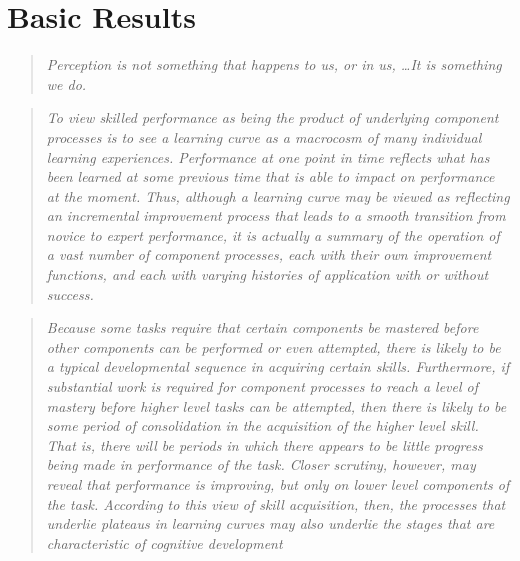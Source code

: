 \documentclass[../main.tex]{subfiles}
\begin{document}
\chapter{Basic Results}\label{chap:basic_results}


\begin{quote}
    \emph{Perception is not something that happens to us, or in us, \lbrack\ldots\rbrack It is something we do.}\\ 
\end{quote}

\begin{quote}
    \emph{To view skilled performance as being the product of underlying component processes is to see a learning curve as a macrocosm of many individual learning experiences. Performance at one point in time reflects what has been learned at some previous time that is able to impact on performance at the moment. Thus, although a learning curve may be viewed as reflecting an incremental improvement process that leads to a smooth transition from novice to expert performance, it is actually a summary of the operation of a vast number of component processes, each with their own improvement functions, and each with varying histories of application with or without success.}\\
\end{quote}

\begin{quote}
    \emph{Because some tasks require that certain components be mastered before other components can be performed or even attempted, there is likely to be a typical developmental sequence in acquiring certain skills. Furthermore, if substantial work is required for component processes to reach a level of mastery before higher level tasks can be attempted, then there is likely to be some period of consolidation in the acquisition of the higher level skill. That is, there will be periods in which there appears to be little progress being made in performance of the task. Closer scrutiny, however, may reveal that performance is improving, but only on lower level components of the task. According to this view of skill acquisition, then, the processes that underlie plateaus in learning curves may also underlie the stages that are characteristic of cognitive development}\\
\end{quote}
\end{document}
